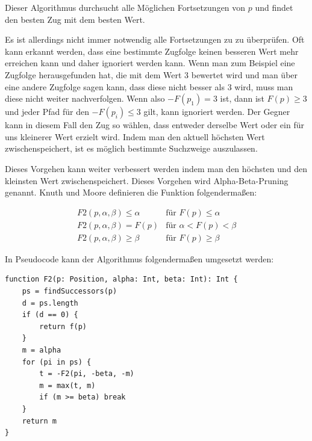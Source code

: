 Dieser Algorithmus durchsucht alle Möglichen Fortsetzungen von $p$ und findet den besten Zug mit dem besten Wert. 
\cite{knuth_analysis_1975}

Es ist allerdings nicht immer notwendig alle Fortsetzungen zu zu überprüfen. Oft kann erkannt werden, dass eine bestimmte Zugfolge keinen besseren Wert mehr erreichen kann und daher ignoriert werden kann.
Wenn man zum Beispiel eine Zugfolge herausgefunden hat, die mit dem Wert 3 bewertet wird und man über eine andere Zugfolge sagen kann, dass diese nicht besser als 3 wird, muss man diese nicht weiter nachverfolgen. Wenn also $-F(p_1) = 3$ ist, dann ist $F(p) \geq 3$ und jeder Pfad für den $-F(p_i) \leq 3$ gilt, kann ignoriert werden.
Der Gegner kann in diesem Fall den Zug so wählen, dass entweder derselbe Wert oder ein für uns kleinerer Wert erzielt wird. Indem man den aktuell höchsten Wert zwischenspeichert, ist es möglich bestimmte Suchzweige auszulassen.
\cite{knuth_analysis_1975}

Dieses Vorgehen kann weiter verbessert werden indem man den höchsten und den kleinsten Wert zwischenspeichert. Dieses Vorgehen wird Alpha-Beta-Pruning genannt. Knuth und Moore definieren die Funktion folgendermaßen:

\begin{equation}
    \begin{array}{ll}
        F2(p, \alpha, \beta) \leq \alpha & \text{für }F(p) \leq \alpha \\
        F2(p, \alpha, \beta) = F(p) & \text{für }\alpha < F(p) < \beta \\
        F2(p, \alpha, \beta) \geq \beta & \text{für }F(p) \geq \beta
    \end{array}
\end{equation}

In Pseudocode kann der Algorithmus folgendermaßen umgesetzt werden:
\begin{lstlisting}[caption=Alpha-Beta-Pruning,label=alphabeta]
function F2(p: Position, alpha: Int, beta: Int): Int {
    ps = findSuccessors(p)
    d = ps.length
    if (d == 0) {
        return f(p)
    }
    m = alpha
    for (pi in ps) {
        t = -F2(pi, -beta, -m)
        m = max(t, m)
        if (m >= beta) break
    }
    return m
}
\end{lstlisting}
\cite{knuth_analysis_1975}

